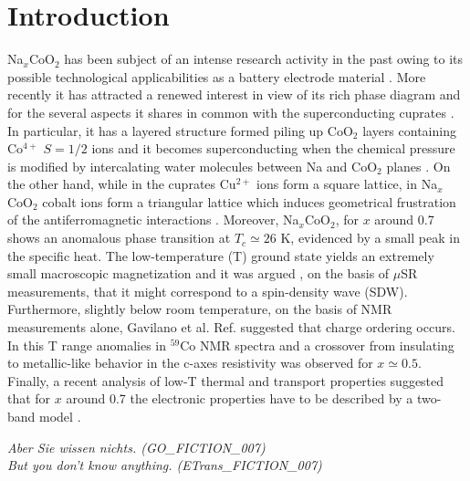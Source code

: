 \documentclass[prb,showpacs,preprintnumbers,amsmath,amssymb,floatfix]{revtex4}
\begin{document}
 \maketitle

\narrowtext

\section{Introduction}

Na$_x$CoO$_2$ has been subject of an intense research activity in
the past owing to its possible technological applicabilities as a
battery electrode material \cite{battery}. More recently it has
attracted a renewed interest in view of its rich phase diagram and
for the several aspects it shares in common with the
superconducting cuprates \cite{Baskaran}. In particular, it has a
layered structure formed piling up CoO$_2$ layers containing
Co$^{4+}$ $S=1/2$ ions \cite{structure} and it becomes
superconducting when the chemical pressure is modified by
intercalating water molecules between Na and CoO$_2$ planes
\cite{superc}. On the other hand, while in the cuprates Cu$^{2+}$
ions form a square lattice, in Na$_x$CoO$_2$ cobalt ions form a
triangular lattice which induces geometrical frustration of the
antiferromagnetic interactions \cite{Pelobianco}. Moreover,
Na$_x$CoO$_2$, for $x$ around 0.7 shows an anomalous phase
transition at $T_c\simeq 26$ K, evidenced by a small peak in the
specific heat. The low-temperature (T) ground state yields an
extremely small macroscopic magnetization \cite{Moto} and it was
argued \cite{muSR}, on the basis of $\mu$SR measurements, that it
might correspond to a spin-density wave (SDW). Furthermore,
slightly below room temperature, on the basis of NMR measurements
alone, Gavilano et al. Ref. suggested that
charge ordering occurs. In this T range anomalies in $^{59}$Co NMR
spectra \cite{NMRRay} and a crossover from insulating to
metallic-like behavior in the c-axes resistivity \cite{resist} was
observed for $x\simeq 0.5$. Finally, a recent analysis of low-T
thermal and transport properties suggested that for $x$ around 0.7
the electronic properties have to be described by a two-band model
\cite{Batlogg}.


\ea\label{ex:culo:24}
  \ea 
\textit{Aber Sie wissen nichts. \textup{(GO\_FICTION\_007)}}\\
  \ex 
\textit{But you don't know anything. \textup{(ETrans\_FICTION\_007)}}
  \z
\z 
\end{document}

